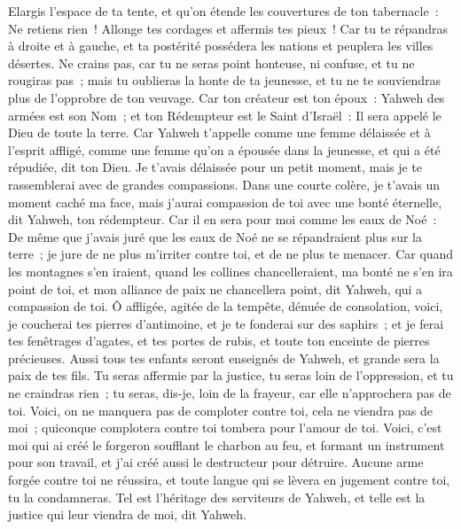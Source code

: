 \begin{multicols}{2}
Elargis l'espace de ta tente, et qu'on étende les couvertures de ton tabernacle~: Ne retiens rien~! Allonge tes cordages et affermis tes pieux~!
Car tu te répandras à droite et à gauche, et ta postérité possédera les nations et peuplera les villes désertes.
Ne crains pas, car tu ne seras point honteuse, ni confuse, et tu ne rougiras pas~; mais tu oublieras la honte de ta jeunesse, et tu ne te souviendras plus de l'opprobre de ton veuvage.
Car ton créateur est ton époux~: Yahweh des armées est son Nom~; et ton Rédempteur est le Saint d'Israël~: Il sera appelé le Dieu de toute la terre.
Car Yahweh t'appelle comme une femme délaissée et à l'esprit affligé, comme une femme qu'on a épousée dans la jeunesse, et qui a été répudiée, dit ton Dieu.
Je t'avais délaissée pour un petit moment, mais je te rassemblerai avec de grandes compassions.
Dans une courte colère, je t'avais un moment caché ma face, mais j'aurai compassion de toi avec une bonté éternelle, dit Yahweh, ton rédempteur.
Car il en sera pour moi comme les eaux de Noé~: De même que j'avais juré que les eaux de Noé ne se répandraient plus sur la terre~; je jure de ne plus m'irriter contre toi, et de ne plus te menacer.
Car quand les montagnes s'en iraient, quand les collines chancelleraient, ma bonté ne s'en ira point de toi, et mon alliance de paix ne chancellera point, dit Yahweh, qui a compassion de toi.
Ô affligée, agitée de la tempête, dénuée de consolation, voici, je coucherai tes pierres d'antimoine, et je te fonderai sur des saphirs~;
et je ferai tes fenêtrages d'agates, et tes portes de rubis, et toute ton enceinte de pierres précieuses.
Aussi tous tes enfants seront enseignés de Yahweh, et grande sera la paix de tes fils.
Tu seras affermie par la justice, tu seras loin de l'oppression, et tu ne craindras rien~; tu seras, dis-je, loin de la frayeur, car elle n'approchera pas de toi.
Voici, on ne manquera pas de comploter contre toi, cela ne viendra pas de moi~; quiconque complotera contre toi tombera pour l'amour de toi.
Voici, c'est moi qui ai créé le forgeron soufflant le charbon au feu, et formant un instrument pour son travail, et j'ai créé aussi le destructeur pour détruire.
Aucune arme forgée contre toi ne réussira, et toute langue qui se lèvera en jugement contre toi, tu la condamneras. Tel est l'héritage des serviteurs de Yahweh, et telle est la justice qui leur viendra de moi, dit Yahweh.

\end{multicols}
